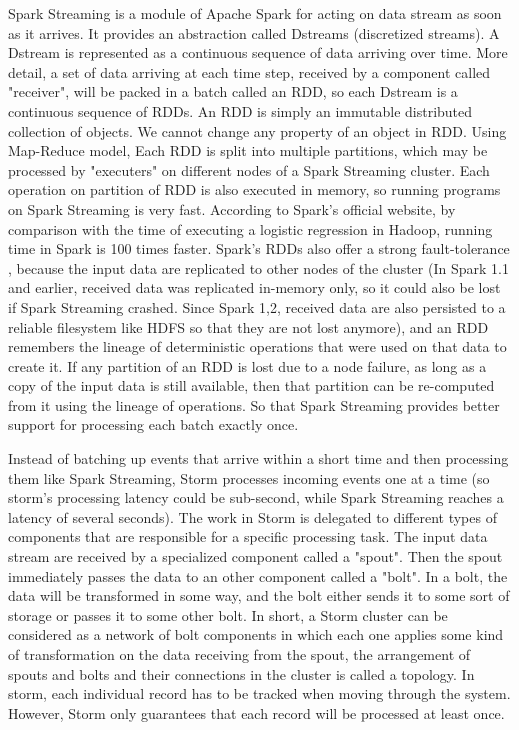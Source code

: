 \documentclass{acm_proc_article-sp}
\begin{document}
Spark Streaming is a module of Apache Spark for acting on data stream as soon as it arrives. It provides an abstraction called Dstreams (discretized streams). A Dstream is represented as a continuous sequence of data arriving over time. More detail, a set of data arriving at each time step, received by a component called "receiver", will be packed in a batch called an RDD, so each Dstream is a continuous sequence of RDDs. An RDD is simply an immutable distributed collection of objects. We cannot change any property of an object in RDD. Using Map-Reduce model, Each RDD is split into multiple partitions, which may be processed by "executers" on different nodes of a Spark Streaming cluster. Each operation on partition of RDD is also executed in memory, so running programs on Spark Streaming is very fast. According to Spark's official website, by comparison with the time of executing a logistic regression in Hadoop, running time in Spark is 100 times faster.
Spark's RDDs also offer a strong fault-tolerance , because the input data are replicated to other nodes of the cluster (In Spark 1.1 and earlier, received data was replicated in-memory only, so it could also be lost if Spark Streaming crashed. Since Spark 1,2, received data are also persisted to a reliable filesystem like HDFS so that they are not lost anymore), and an RDD remembers the lineage of deterministic operations that were used on that data to create it. If any partition of an RDD is lost due to a node failure, as long as a copy of the input data is still available, then that partition can be re-computed from it using the lineage of operations. So that Spark Streaming provides better support for processing each batch exactly once.

Instead of batching up events that arrive within a short time and then processing them like Spark Streaming, Storm processes incoming events one at a time (so storm's processing latency could be sub-second, while Spark Streaming reaches a latency of several seconds). The work in Storm is delegated to different types of components that are responsible for a specific processing task. The input data stream are received by a specialized component called a  "spout". Then the spout immediately passes the data to an other component called a "bolt". In a bolt, the data will be transformed in some way, and the bolt either sends it to some sort of storage or passes it to some other bolt. In short, a Storm cluster can be considered as a network of bolt components in which each one applies some kind of transformation on the data receiving from the spout, the arrangement of spouts and bolts and their connections in the cluster is called a topology. In storm, each individual record has to be tracked when moving through the system. However, Storm only guarantees that each record will be processed at least once.
\end{document}
